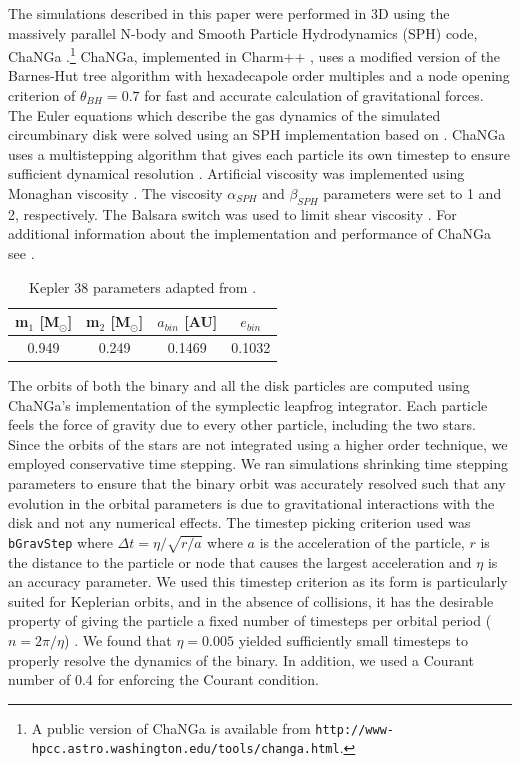 The simulations described in this paper were performed in 3D using the massively parallel N-body 
and Smooth Particle Hydrodynamics (SPH) code, ChaNGa
\citep{Menon15}.\footnote{A public version of ChaNGa is available
  from {\tt http://www-hpcc.astro.washington.edu/tools/changa.html}.}
ChaNGa, implemented in Charm++ \citep{Kale1996}, uses a modified version of the Barnes-Hut tree algorithm with hexadecapole 
order multiples and a node opening criterion of $\theta_{BH} =
  0.7$ for fast and accurate calculation of gravitational forces.  The Euler equations which describe
the gas dynamics of the simulated circumbinary disk were solved using an SPH implementation based on
\citet{Wadsley04}.  ChaNGa uses a multistepping algorithm that gives
each particle its own timestep to ensure sufficient dynamical
resolution \citep{Quinn97}.  Artificial viscosity was implemented using
Monaghan viscosity \citep{Monaghan83}.  The viscosity $\alpha_{SPH}$
  and $\beta_{SPH}$ parameters were set to 1 and 2, respectively.  The Balsara switch was used to limit shear viscosity \citep{Balsara1995}.  For additional information about the implementation and performance of ChaNGa see \citet{Jetley2008}.

\begin{table}
	\centering
	\caption{Kepler 38 parameters adapted from \citet{Orosz12}.}
	\begin{tabular}{cccc} %
		\hline
		m$_1$ [M$_{\odot}$] & m$_2$ [M$_{\odot}$] & $a_{bin}$ [AU] & $e_{bin}$\\
		\hline
		0.949 & 0.249 & 0.1469 & 0.1032\\
		\hline
	\end{tabular}
	\label{tab:table_1}
\end{table}

The orbits of both the binary and all the disk particles are computed using ChaNGa's implementation of the 
symplectic leapfrog integrator.  Each particle feels the force of gravity due to every other particle, including
the two stars.  Since the orbits of the stars are not integrated using a higher order technique, we employed conservative
time stepping.  We ran simulations shrinking time stepping parameters to 
ensure that the binary orbit was accurately resolved such that any evolution in the orbital parameters is due to 
gravitational interactions with the disk and not any numerical
effects.  The timestep picking criterion used was {\tt bGravStep} where  
$\Delta t = \eta/\sqrt{r/a}$ where $a$ is the acceleration of the
particle, $r$ is the distance to the particle or node that causes the largest
acceleration and $\eta$ is an accuracy parameter.  We used this timestep criterion as its form is particularly suited for Keplerian orbits, and in the absence of collisions, it has the desirable property of giving the particle a fixed number of timesteps per orbital period ($n = 2\pi/ \eta$) \citep{Richardson2000}.  We found that 
$\eta = 0.005$ yielded sufficiently small timesteps to properly
resolve the dynamics of the binary.  In addition, we used a Courant number of
0.4 for enforcing the Courant condition.

